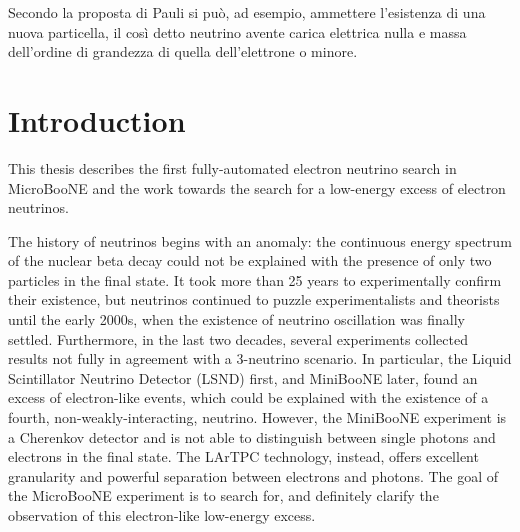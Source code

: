 \begin{savequote}[8cm]
 Secondo la proposta di Pauli si può, ad esempio, ammettere l'esistenza di una nuova particella, il così detto neutrino avente carica elettrica nulla e massa dell'ordine di grandezza di quella dell'elettrone o minore.
\end{savequote}

\chapter{\label{ch:1-intro}Introduction} 

This thesis describes the first fully-automated electron neutrino search in MicroBooNE and the work towards the search for a low-energy excess of electron neutrinos.

The history of neutrinos begins with an anomaly: the continuous energy spectrum of the nuclear beta decay could not be explained with the presence of only two particles in the final state. It took more than 25 years to experimentally confirm their existence, but neutrinos continued to puzzle experimentalists and theorists until the early 2000s, when the existence of neutrino oscillation was finally settled. 
Furthermore, in the last two decades, several experiments collected results not fully in agreement with a 3-neutrino scenario.
In particular, the Liquid Scintillator Neutrino Detector (LSND) first, and MiniBooNE later, found an excess of electron-like events, which could be explained with the existence of a fourth, non-weakly-interacting, neutrino. However, the MiniBooNE experiment is a Cherenkov detector and is not able to distinguish between single photons and electrons in the final state. The LArTPC technology, instead, offers excellent granularity and powerful separation between electrons and photons. The goal of the MicroBooNE experiment is to search for, and definitely clarify the observation of this electron-like low-energy excess.

